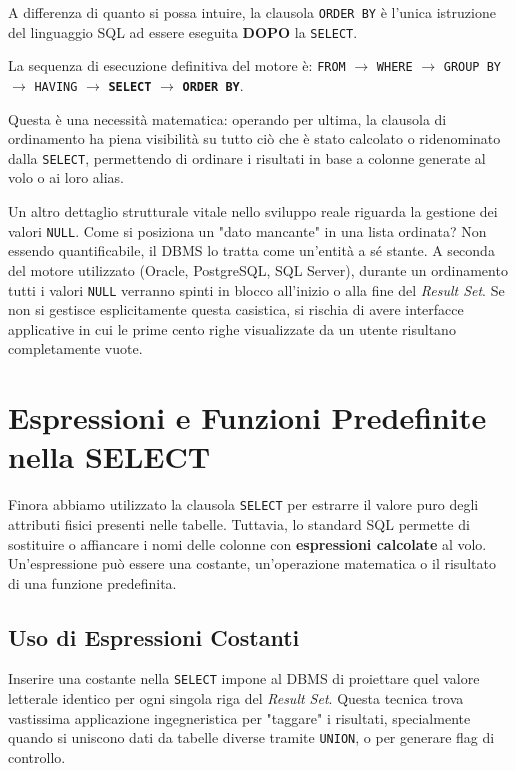 \begin{warningbox}
A differenza di quanto si possa intuire, la clausola \texttt{ORDER BY} è l'unica istruzione del linguaggio SQL ad essere eseguita \textbf{DOPO} la \texttt{SELECT}. 

La sequenza di esecuzione definitiva del motore è:
\texttt{FROM} $\rightarrow$ \texttt{WHERE} $\rightarrow$ \texttt{GROUP BY} $\rightarrow$ \texttt{HAVING} $\rightarrow$ \textbf{\texttt{SELECT}} $\rightarrow$ \textbf{\texttt{ORDER BY}}.

Questa è una necessità matematica: operando per ultima, la clausola di ordinamento ha piena visibilità su tutto ciò che è stato calcolato o ridenominato dalla \texttt{SELECT}, permettendo di ordinare i risultati in base a colonne generate al volo o ai loro alias.

Un altro dettaglio strutturale vitale nello sviluppo reale riguarda la gestione dei valori \texttt{NULL}. Come si posiziona un "dato mancante" in una lista ordinata? Non essendo quantificabile, il DBMS lo tratta come un'entità a sé stante. A seconda del motore utilizzato (Oracle, PostgreSQL, SQL Server), durante un ordinamento tutti i valori \texttt{NULL} verranno spinti in blocco all'inizio o alla fine del \textit{Result Set}. Se non si gestisce esplicitamente questa casistica, si rischia di avere interfacce applicative in cui le prime cento righe visualizzate da un utente risultano completamente vuote.
\end{warningbox}



\section{Espressioni e Funzioni Predefinite nella SELECT}

Finora abbiamo utilizzato la clausola \texttt{SELECT} per estrarre il valore puro degli attributi fisici presenti nelle tabelle. Tuttavia, lo standard SQL permette di sostituire o affiancare i nomi delle colonne con \textbf{espressioni calcolate} al volo. Un'espressione può essere una costante, un'operazione matematica o il risultato di una funzione predefinita.

\subsection{Uso di Espressioni Costanti}
Inserire una costante nella \texttt{SELECT} impone al DBMS di proiettare quel valore letterale identico per ogni singola riga del \textit{Result Set}. 
Questa tecnica trova vastissima applicazione ingegneristica per "taggare" i risultati, specialmente quando si uniscono dati da tabelle diverse tramite \texttt{UNION}, o per generare flag di controllo.

